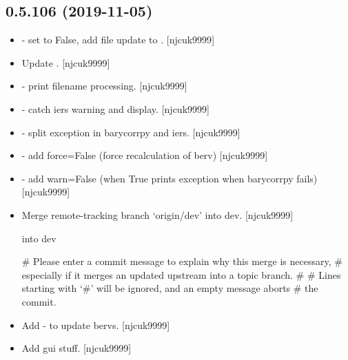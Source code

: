 \documentclass[a4paper,10pt,english]{report}
\begin{document}
\subsection{0.5.106 (2019-11-05)}
\label{\detokenize{misc/changelog:id37}}\begin{itemize}
\item {} 
 - set  to False, add file update to
. {[}njcuk9999{]}

\item {} 
Update . {[}njcuk9999{]}

\item {} 
 - print filename processing. {[}njcuk9999{]}

\item {} 
 - catch iers warning and display. {[}njcuk9999{]}

\item {} 
 - split exception in barycorrpy and iers.
{[}njcuk9999{]}

\item {} 
 - add force=False (force recalculation of
berv) {[}njcuk9999{]}

\item {} 
 - add warn=False (when True prints exception
when barycorrpy fails) {[}njcuk9999{]}

\item {} 
Merge remote-tracking branch ‘origin/dev’ into dev. {[}njcuk9999{]}

 into dev

\# Please enter a commit message to explain why this merge is necessary,
\# especially if it merges an updated upstream into a topic branch.
\#
\# Lines starting with ‘\#’ will be ignored, and an empty message aborts
\# the commit.

\item {} 
Add  - to update bervs. {[}njcuk9999{]}

\item {} 
Add gui stuff. {[}njcuk9999{]}

\end{itemize}
\end{document}
